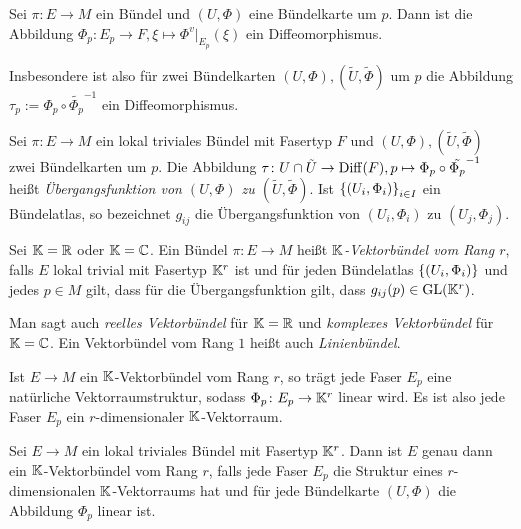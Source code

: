 \begin{proposition}
  Sei $\pi \colon E \to M$ ein Bündel und $(U,\Phi)$ eine Bündelkarte
  um $p$. Dann ist die Abbildung $\Phi_p \colon E_p \to F, \xi \mapsto
  \Phi^v|_{E_p}(\xi)$ ein Diffeomorphismus.

  Insbesondere ist also für zwei Bündelkarten  $(U,\Phi),(\tilde
  U,\tilde \Phi)$ um $p$ die Abbildung
  $\tau_p := \Phi_p\circ\tilde{\Phi_p}^{-1}$ ein Diffeomorphismus. 
\end{proposition}

\begin{definition}
  Sei $\pi \colon E \to M$ ein lokal triviales Bündel mit Fasertyp $F$ und $(U,\Phi),(\tilde
  U,\tilde \Phi)$ zwei Bündelkarten um $p$. Die Abbildung $\tau \colon
  U \cap \tilde U \to \operatorname{Diff}(F), p \mapsto
  \Phi_p\circ\tilde{\Phi_p}^{-1}$ heißt \emph{Übergangsfunktion von
    $(U,\Phi)$ zu $(\tilde U,\tilde\Phi)$}. Ist
  $\left\lbrace (U_i,\Phi_i) \right\rbrace_{i\in I}$ ein Bündelatlas, so bezeichnet
  $g_{ij}$ die Übergangsfunktion von $(U_i,\Phi_i)$ zu $(U_j,\Phi_j)$.
\end{definition}

\begin{definition}
  Sei $\mathbb{K} = \mathbb{R}$ oder $\mathbb{K} = \mathbb{C}$. Ein Bündel $\pi\colon E\to M$ heißt
  \emph{$\mathbb{K}$-Vektorbündel vom Rang $r$}, falls $E$ lokal trivial mit
  Fasertyp $\mathbb{K}^r$ ist und für jeden Bündelatlas $\left\lbrace (U_i,\Phi_i) \right\rbrace$
  und jedes $p\in M$ gilt, dass für die Übergangsfunktion gilt, dass
  $g_{ij}(p)\in\operatorname{GL}(\mathbb{K}^r)$. 

  Man sagt auch \emph{reelles Vektorbündel} für $\mathbb{K}=\mathbb{R}$ und
  \emph{komplexes Vektorbündel} für $\mathbb{K}=\mathbb{C}$. Ein Vektorbündel vom Rang
  $1$ heißt auch \emph{Linienbündel}.
\end{definition}

\begin{proposition}
  Ist $E\to M$ ein $\mathbb{K}$-Vektorbündel vom Rang $r$, so trägt jede Faser $E_p$ eine
  natürliche Vektorraumstruktur, sodass $\Phi_p\colon E_p \to \mathbb{K}^r$
  linear wird. Es ist also jede Faser $E_p$ ein $r$-dimensionaler $\mathbb{K}$-Vektorraum.
\end{proposition}

\begin{proposition}
  Sei $E\to M$ ein lokal triviales Bündel mit Fasertyp $\mathbb{K}^r$. Dann
  ist $E$ genau dann ein $\mathbb{K}$-Vektorbündel vom Rang $r$, falls jede
  Faser $E_p$ die Struktur eines $r$-dimensionalen $\mathbb{K}$-Vektorraums
  hat und für jede Bündelkarte $(U,\Phi)$ die Abbildung $\Phi_p$
  linear ist.
\end{proposition}

